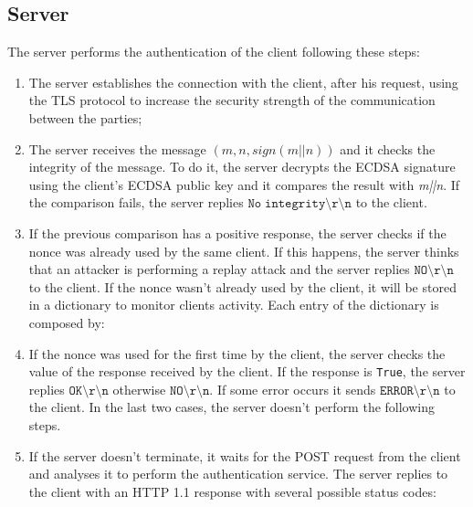 \subsection{Server}
The server performs the authentication of the client following these steps:
\begin{enumerate}
\item{The server establishes the connection with the client, after his request, using the TLS protocol to increase the security strength of the communication between the parties;}
\item{The server receives the message $(m, n, sign(m||n))$ and it checks the integrity of the message. To do it, the server decrypts the ECDSA signature using the client's ECDSA public key and it compares the result with \textit{m||n}. If the comparison fails, the server replies $\mathtt{No\;integrity\setminus r\setminus n}$ to the client.}
\item{If the previous comparison has a positive response, the server checks if the nonce was already used by the same client. If this happens, the server thinks that an attacker is performing a replay attack and the server replies $\mathtt{NO\setminus r\setminus n}$ to the client. If the nonce wasn't already used by the client, it will be stored in a dictionary to monitor clients activity. Each entry of the dictionary is composed by:
\begin{itemize}
\end{itemize}
}
\item{If the nonce was used for the first time by the client, the server checks the value of the response received by the client. If the response is \texttt{True}, the server replies $\mathtt{OK\setminus r\setminus n}$ otherwise $\mathtt{NO\setminus r\setminus n}$. If some error occurs it sends $\mathtt{ERROR\setminus r\setminus n}$ to the client. In the last two cases, the server doesn't perform the following steps.}
\item{If the server doesn't terminate, it waits for the POST request from the client and analyses it to perform the authentication service. The server replies to the client with an HTTP 1.1 response with several possible status codes:
}
\end{enumerate}
